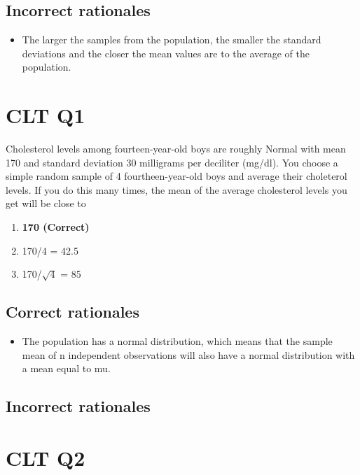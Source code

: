 \documentclass[letterpaper,9pt,twoside,printwatermark=false]{pinp}
\providecommand{\tightlist}{%
  \setlength{\itemsep}{0pt}\setlength{\parskip}{0pt}}
\begin{document}
\subsection{Incorrect rationales}\label{incorrect-rationales-1}

\begin{itemize}
\tightlist
\item
  The larger the samples from the population, the smaller the standard
  deviations and the closer the mean values are to the average of the
  population.
\end{itemize}

\section{CLT Q1}\label{clt-q1}

Cholesterol levels among fourteen-year-old boys are roughly Normal with
mean 170 and standard deviation 30 milligrams per deciliter (mg/dl). You
choose a simple random sample of 4 fourtheen-year-old boys and average
their choleterol levels. If you do this many times, the mean of the
average cholesterol levels you get will be close to

\begin{enumerate}
\def\labelenumi{\alph{enumi})}
\tightlist
\item
  \textbf{170 (Correct)}
\item
  170/4 = 42.5
\item
  170/\(\sqrt{4}\) = 85
\end{enumerate}

\subsection{Correct rationales}\label{correct-rationales-2}

\begin{itemize}
\tightlist
\item
  The population has a normal distribution, which means that the sample
  mean of n independent observations will also have a normal
  distribution with a mean equal to mu.
\end{itemize}

\subsection{Incorrect rationales}\label{incorrect-rationales-2}

\section{CLT Q2}\label{clt-q2}
\end{document}
